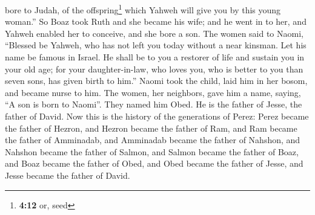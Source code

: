 bore to Judah, of the offspring\footnote{\textbf{4:12} or, seed} which
Yahweh will give you by this young woman.''  So Boaz took
Ruth and she became his wife; and he went in to her, and Yahweh enabled
her to conceive, and she bore a son.  The women said to
Naomi, ``Blessed be Yahweh, who has not left you today without a near
kinsman. Let his name be famous in Israel.  He shall be
to you a restorer of life and sustain you in your old age; for your
daughter-in-law, who loves you, who is better to you than seven sons,
has given birth to him.''  Naomi took the child, laid him
in her bosom, and became nurse to him.  The women, her
neighbors, gave him a name, saying, ``A son is born to Naomi''. They
named him Obed. He is the father of Jesse, the father of David.
 Now this is the history of the generations of Perez:
Perez became the father of Hezron,  and Hezron became the
father of Ram, and Ram became the father of Amminadab, 
and Amminadab became the father of Nahshon, and Nahshon became the
father of Salmon,  and Salmon became the father of Boaz,
and Boaz became the father of Obed,  and Obed became the
father of Jesse, and Jesse became the father of David.

